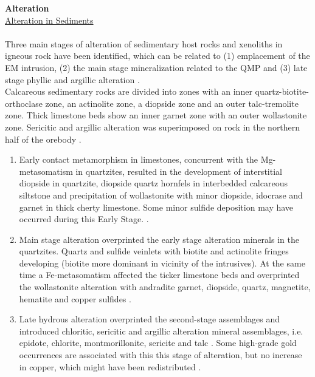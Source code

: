 \documentclass[a4paper,11pt,titlepage]{article}
\begin{document}
\textbf{Alteration}
\\\underline{Alteration in Sediments}
\\
\\Three main stages of alteration of sedimentary host rocks and xenoliths in igneous rock have been identified, which can be related to (1) emplacement of the EM intrusion, (2) the main stage mineralization related to the QMP and (3) late stage phyllic and argillic alteration \citep{Babcock1995}.
\\Calcareous sedimentary rocks are divided into zones with an inner quartz-biotite-orthoclase zone, an actinolite zone, a diopside zone and an outer talc-tremolite zone. Thick limestone beds show an inner garnet zone with an outer wollastonite zone. Sericitic and argillic alteration was superimposed on rock in the northern half of the orebody \citep{Lanier1978}.
\vspace{5pt}
\renewcommand{\theenumi}{\Alph{enumi}}
\begin{enumerate}
\item Early contact metamorphism in limestones, concurrent with the Mg-metasomatism in quartzites, resulted in the development of interstitial diopside in quartzite, diopside quartz hornfels in interbedded calcareous siltstone and precipitation of wollastonite with minor diopside, idocrase and garnet in thick cherty limestone. Some minor sulfide deposition may have occurred during this Early Stage. \citep{Atkinson1978a}.
\item Main stage alteration overprinted the early stage alteration minerals in the quartzites. Quartz and sulfide veinlets with biotite and actinolite fringes developing (biotite more dominant in vicinity of the intrusives). At the same time a Fe-metasomatism affected the ticker limestone beds and overprinted the wollastonite alteration with andradite garnet, diopside, quartz, magnetite, hematite and copper sulfides \citep{Lanier1978}.
\item Late hydrous alteration overprinted the second-stage assemblages and introduced chloritic, sericitic and argillic alteration mineral assemblages, i.e. epidote, chlorite, montmorillonite, sericite and talc \citep{Lanier1978}. Some high-grade gold occurrences are associated with this this stage of alteration, but no increase in copper, which might have been redistributed \citep{Babcock1995}.
\end{enumerate}
\end{document}
